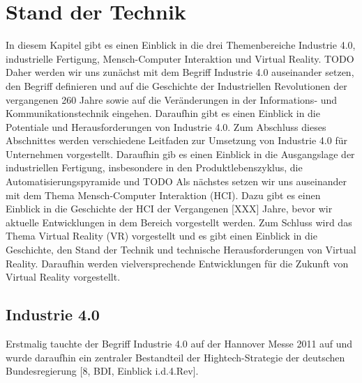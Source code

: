 \chapter{Stand der Technik}\label{cha:StandDerTechnik}

In diesem Kapitel gibt es einen Einblick in die drei Themenbereiche Industrie 4.0, industrielle Fertigung, Mensch-Computer Interaktion und Virtual Reality.  TODO
\newline\newline
Daher werden wir uns zunächst mit dem Begriff Industrie 4.0 auseinander setzen, den Begriff definieren und auf die Geschichte der Industriellen Revolutionen der vergangenen 260 Jahre sowie auf die Veränderungen in der Informations- und Kommunikationstechnik eingehen. Daraufhin gibt es einen Einblick in die Potentiale und Herausforderungen von Industrie 4.0. Zum Abschluss dieses Abschnittes werden verschiedene Leitfaden zur Umsetzung von Industrie 4.0 für Unternehmen vorgestellt.
\newline\newline
Daraufhin gib es einen Einblick in die Ausgangslage der industriellen Fertigung, insbesondere in den Produktlebenszyklus, die Automatisierungspyramide und TODO
\newline\newline
Als nächstes setzen wir uns auseinander mit dem Thema Mensch-Computer Interaktion (HCI). Dazu gibt es einen Einblick in die Geschichte der HCI der Vergangenen [XXX] Jahre, bevor wir aktuelle Entwicklungen in dem Bereich vorgestellt werden.
\newline\newline
Zum Schluss wird das Thema Virtual Reality (VR) vorgestellt und es gibt einen Einblick in die Geschichte, den Stand der Technik und technische Herausforderungen von Virtual Reality. Daraufhin werden vielversprechende Entwicklungen für die Zukunft von Virtual Reality vorgestellt.


\section{Industrie 4.0}\label{sec:Industrie4.0}
Erstmalig tauchte der Begriff Industrie 4.0 auf der Hannover Messe 2011 auf und wurde daraufhin ein zentraler Bestandteil der Hightech-Strategie der deutschen Bundesregierung [8, BDI, Einblick i.d.4.Rev].

